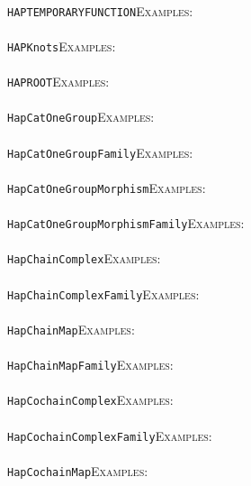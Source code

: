 \documentclass[a4paper,11pt]{report}
\begin{document}
{{ \\
 \texttt{HAPTEMPORARYFUNCTION}{\nobreakspace}{\nobreakspace}{\nobreakspace}{\nobreakspace}\textsc{Examples:} \\
 \\
 \texttt{HAP{\textunderscore}Knots}{\nobreakspace}{\nobreakspace}{\nobreakspace}{\nobreakspace}\textsc{Examples:} \\
 \\
 \texttt{HAP{\textunderscore}ROOT}{\nobreakspace}{\nobreakspace}{\nobreakspace}{\nobreakspace}\textsc{Examples:} \\
 \\
 \texttt{HapCatOneGroup}{\nobreakspace}{\nobreakspace}{\nobreakspace}{\nobreakspace}\textsc{Examples:} \\
 \\
 \texttt{HapCatOneGroupFamily}{\nobreakspace}{\nobreakspace}{\nobreakspace}{\nobreakspace}\textsc{Examples:} \\
 \\
 \texttt{HapCatOneGroupMorphism}{\nobreakspace}{\nobreakspace}{\nobreakspace}{\nobreakspace}\textsc{Examples:} \\
 \\
 \texttt{HapCatOneGroupMorphismFamily}{\nobreakspace}{\nobreakspace}{\nobreakspace}{\nobreakspace}\textsc{Examples:} \\
 \\
 \texttt{HapChainComplex}{\nobreakspace}{\nobreakspace}{\nobreakspace}{\nobreakspace}\textsc{Examples:} \\
 \\
 \texttt{HapChainComplexFamily}{\nobreakspace}{\nobreakspace}{\nobreakspace}{\nobreakspace}\textsc{Examples:} \\
 \\
 \texttt{HapChainMap}{\nobreakspace}{\nobreakspace}{\nobreakspace}{\nobreakspace}\textsc{Examples:} \\
 \\
 \texttt{HapChainMapFamily}{\nobreakspace}{\nobreakspace}{\nobreakspace}{\nobreakspace}\textsc{Examples:} \\
 \\
 \texttt{HapCochainComplex}{\nobreakspace}{\nobreakspace}{\nobreakspace}{\nobreakspace}\textsc{Examples:} \\
 \\
 \texttt{HapCochainComplexFamily}{\nobreakspace}{\nobreakspace}{\nobreakspace}{\nobreakspace}\textsc{Examples:} \\
 \\
 \texttt{HapCochainMap}{\nobreakspace}{\nobreakspace}{\nobreakspace}{\nobreakspace}\textsc{Examples:} \\
}}
\end{document}

